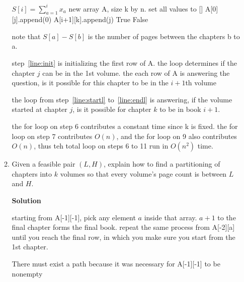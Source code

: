 \documentclass[letterpaper,12pt]{article}
\begin{document}
\begin{enumerate}
\begin{enumerate}
\begin{algorithmic}[1]
    \State \(S[i] = \sum_{a=1}^i x_a\)
    \State new array A, size k by n. set all values to []
     \label{line:init}
            \State A[0][j].append(0)
        \EndIf
    \EndFor
     \label{line:startl}
                        \State A[i+1][k].append(j)
                    \EndIf
                \EndFor
            \EndIf
        \EndFor
    \EndFor\label{line:endl}
        \State \Return True
    \EndIf
    \State \Return False
\end{algorithmic}

note that  \(S[a]-S[b]\) is the number of pages between the chapters b to a.

step~\ref{line:init} is initializing the first row of A. the loop determines if the chapter \(j\) can be in the 1st volume. the each row of A is answering the question, is it possible for this chapter to be in the \(i+1\)th volume

the loop from step~\ref{line:startl} to~\ref{line:endl} is answering, if the volume started at chapter \(j\), is it possible for chapter \(k\) to be in book \(i+1\). 

the for loop on step 6 contributes a constant time since k is fixed. the for loop on step 7 contributes \(O(n)\), and the for loop on 9 also contributes \(O(n)\), thus teh total loop on steps 6 to 11 run in \(O(n^2)\) time. 





\item Given a feasible pair $(L, H)$, explain how to find a partitioning of chapters into $k$ volumes so that every volume's page count is between $L$ and $H$. 

\textbf{Solution}

starting from A[-1][-1], pick any element \(a\) inside that array. \(a+1\) to the final chapter forms the final book. repeat the same process from A[-2][a] until you reach the final row, in which you make sure you start from the 1st chapter. 

There must exist a path because it was necessary for A[-1][-1] to be nonempty



\end{enumerate}
\end{enumerate}
\end{document}
